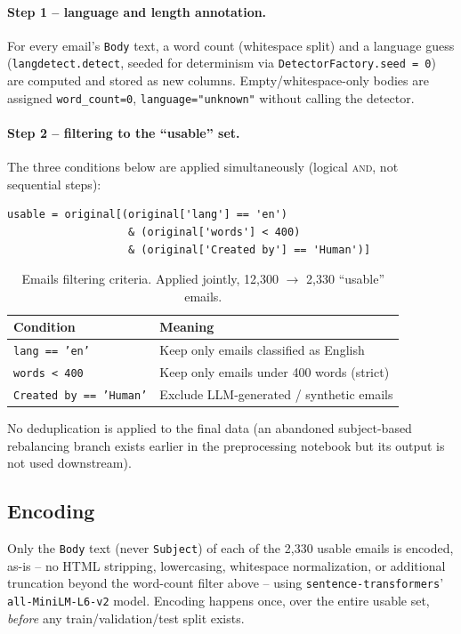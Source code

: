 \documentclass[11pt]{article}
\newcommand{\code}[1]{\texttt{#1}}
\begin{document}
\paragraph{Step 1 -- language and length annotation.} For every email's
\code{Body} text, a word count (whitespace split) and a language guess
(\code{langdetect.detect}, seeded for determinism via
\code{DetectorFactory.seed = 0}) are computed and stored as new columns.
Empty/whitespace-only bodies are assigned \code{word\_count=0},
\code{language="unknown"} without calling the detector.

\paragraph{Step 2 -- filtering to the ``usable'' set.} The three conditions
below are applied simultaneously (logical \textsc{and}, not sequential
steps):

\begin{lstlisting}
usable = original[(original['lang'] == 'en')
                   & (original['words'] < 400)
                   & (original['Created by'] == 'Human')]
\end{lstlisting}

\begin{table}[h]
\centering
\begin{tabular}{ll}
\toprule
Condition & Meaning \\
\midrule
\code{lang == 'en'} & Keep only emails classified as English \\
\code{words < 400} & Keep only emails under 400 words (strict) \\
\code{Created by == 'Human'} & Exclude LLM-generated / synthetic emails \\
\bottomrule
\end{tabular}
\caption{Emails filtering criteria. Applied jointly, 12{,}300 $\rightarrow$ 2{,}330 ``usable'' emails.}
\end{table}

No deduplication is applied to the final data (an abandoned subject-based
rebalancing branch exists earlier in the preprocessing notebook but its
output is not used downstream).

\subsection{Encoding}

Only the \code{Body} text (never \code{Subject}) of each of the 2{,}330
usable emails is encoded, as-is -- no HTML stripping, lowercasing,
whitespace normalization, or additional truncation beyond the word-count
filter above -- using \code{sentence-transformers}' \code{all-MiniLM-L6-v2}
model. Encoding happens once, over the entire usable set, \emph{before} any
train/validation/test split exists.
\end{document}
